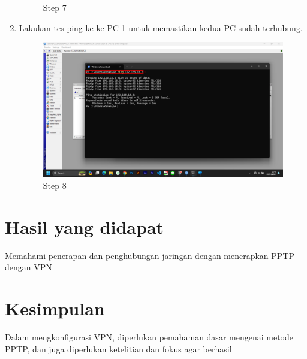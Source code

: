 \begin{center}
\begin{enumerate}
\begin{figure}[H]
			\caption{Step 7}
			\label{fig:Step 7(PC 2)}
		\end{figure}
        \item Lakukan tes ping ke ke PC 1 untuk memastikan kedua PC sudah terhubung.
        \begin{figure}[H]
			\centering
			\includegraphics[width=0.8\linewidth]{P4/img/pc2/Step 7.png}
			\caption{Step 8}
			\label{fig:Step 8(PC 2)}
		\end{figure}
    \end{enumerate}
\end{center}

\section{Hasil yang didapat}
Memahami penerapan dan penghubungan jaringan dengan menerapkan PPTP dengan VPN

\section{Kesimpulan}
Dalam mengkonfigurasi VPN, diperlukan pemahaman dasar mengenai metode PPTP, dan juga diperlukan ketelitian dan fokus agar berhasil
